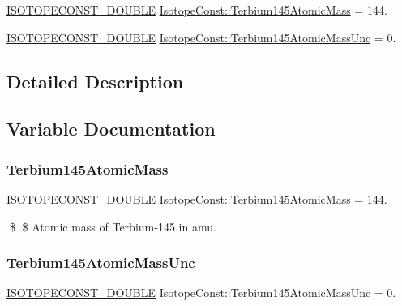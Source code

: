 \begin{DoxyCompactItemize}
\item 
\mbox{\hyperlink{group___isotope_const-_macros_ga8f45a7272ce02c0b4c65c44636ed719a}{I\+S\+O\+T\+O\+P\+E\+C\+O\+N\+S\+T\+\_\+\+D\+O\+U\+B\+LE}} \mbox{\hyperlink{group___isotope_const-_terbium-_tb145_gaa2da08cd8f9253bdd0ac0b360d5dd3cc}{Isotope\+Const\+::\+Terbium145\+Atomic\+Mass}} = 144.
\item 
\mbox{\hyperlink{group___isotope_const-_macros_ga8f45a7272ce02c0b4c65c44636ed719a}{I\+S\+O\+T\+O\+P\+E\+C\+O\+N\+S\+T\+\_\+\+D\+O\+U\+B\+LE}} \mbox{\hyperlink{group___isotope_const-_terbium-_tb145_ga2035b227661bf8597329f1a3570ccf66}{Isotope\+Const\+::\+Terbium145\+Atomic\+Mass\+Unc}} = 0.
\end{DoxyCompactItemize}


\subsection{Detailed Description}


\subsection{Variable Documentation}
\mbox{\label{group___isotope_const-_terbium-_tb145_gaa2da08cd8f9253bdd0ac0b360d5dd3cc}} 
\subsubsection{\texorpdfstring{Terbium145\+Atomic\+Mass}{Terbium145AtomicMass}}
{\footnotesize\ttfamily \mbox{\hyperlink{group___isotope_const-_macros_ga8f45a7272ce02c0b4c65c44636ed719a}{I\+S\+O\+T\+O\+P\+E\+C\+O\+N\+S\+T\+\_\+\+D\+O\+U\+B\+LE}} Isotope\+Const\+::\+Terbium145\+Atomic\+Mass = 144.}

\$ \$ Atomic mass of Terbium-\/145 in amu. \mbox{\label{group___isotope_const-_terbium-_tb145_ga2035b227661bf8597329f1a3570ccf66}} 
\subsubsection{\texorpdfstring{Terbium145\+Atomic\+Mass\+Unc}{Terbium145AtomicMassUnc}}
{\footnotesize\ttfamily \mbox{\hyperlink{group___isotope_const-_macros_ga8f45a7272ce02c0b4c65c44636ed719a}{I\+S\+O\+T\+O\+P\+E\+C\+O\+N\+S\+T\+\_\+\+D\+O\+U\+B\+LE}} Isotope\+Const\+::\+Terbium145\+Atomic\+Mass\+Unc = 0.}

